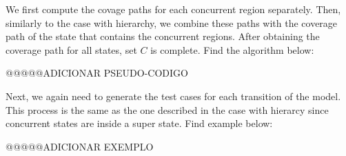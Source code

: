 We first compute the covage paths for each concurrent region separately. Then, similarly to the case with hierarchy, we combine these paths with the coverage path of the state that contains the concurrent regions. After obtaining the coverage path for all states, set $C$ is complete. Find the algorithm below:

@@@@@ADICIONAR PSEUDO-CODIGO

Next, we again need to generate the test cases for each transition of the model. This process is the same as the one described in the case with hierarcy since concurrent states are inside a super state. Find example below:

@@@@@ADICIONAR EXEMPLO

